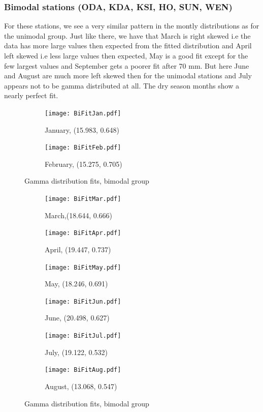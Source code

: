 \documentclass{article}
\begin{document}
	\subsubsection{Bimodal stations (ODA, KDA, KSI, HO, SUN, WEN)}
	For these stations, we see a very similar pattern in the montly distributions as for the unimodal group. Just like there, we have that March is right skewed i.e the data has more large values then expected from the fitted distribution and April left skewed i.e less large values then expected, May is a good fit except for the few largest values and September gets a poorer fit after 70 mm. But here June and August are much more left skewed then for the unimodal stations and July appears not to be gamma distributed at all. The dry season months show a nearly perfect fit. 
		\begin{figure}[H]
		\ContinuedFloat*
		\centering
		\begin{subfigure}{0.4\textwidth}
			\centering
			\texttt{[image: BiFitJan.pdf]}
			\caption{January, (15.983, 0.648)}
		\end{subfigure}%
		\begin{subfigure}{0.4\textwidth}
			\centering
			\texttt{[image: BiFitFeb.pdf]}
			\caption{February, (15.275, 0.705)}
		\end{subfigure}
		\caption{Gamma distribution fits, bimodal group}
		\label{GammaFitBi}
	\end{figure}
		\begin{figure}[H]
		\ContinuedFloat
		\centering
		\begin{subfigure}{0.5\textwidth}
			\centering
			\texttt{[image: BiFitMar.pdf]}
			\caption{March,(18.644, 0.666)}
		\end{subfigure}%
		\begin{subfigure}{0.5\textwidth}
			\centering
			\texttt{[image: BiFitApr.pdf]}
			\caption{April, (19.447, 0.737)}
		\end{subfigure}
		\begin{subfigure}{0.5\textwidth}
			\centering
			\texttt{[image: BiFitMay.pdf]}
			\caption{May, (18.246, 0.691)}
		\end{subfigure}%
		\begin{subfigure}{0.5\textwidth}
			\centering
			\texttt{[image: BiFitJun.pdf]}
			\caption{June, (20.498, 0.627)}
		\end{subfigure}
		\begin{subfigure}{0.5\textwidth}
			\centering
			\texttt{[image: BiFitJul.pdf]}
			\caption{July, (19.122, 0.532)}
		\end{subfigure}%
		\begin{subfigure}{0.5\textwidth}
			\centering
			\texttt{[image: BiFitAug.pdf]}
			\caption{August, (13.068, 0.547)}
		\end{subfigure}
		\caption{Gamma distribution fits, bimodal group}
	\end{figure}
\end{document}
